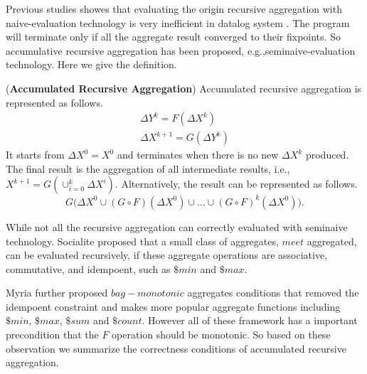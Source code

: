 {\color{red}
	Previous studies\cite{Seo:2013:DSD:2556549.2556572,Wang:2015:AFR:2824032.2824052,Lam:2013:SDE:2510649.2511289} showes that evaluating  the origin recursive aggregation with naive-evaluation technology is very inefficient in datalog system . The program will terminate only if all the aggregate result converged to their fixpoints. So accumulative recursive aggregation has been proposed, e.g.,seminaive-evaluation technology. Here we give the definition.
	
\begin{definition}
	\label{def:accumasync}
	(\textbf{Accumulated Recursive Aggregation}) Accumulated recursive aggregation is represented as follows.
	\begin{equation}\label{eq:accumasync}
	\begin{aligned}
	\Delta Y^{k}= F(\Delta X^k)\\
	\Delta X^{k+1}= G(\Delta Y^{k})
	\end{aligned}
	\end{equation}
	It starts from $\Delta X^0=X^0$ and terminates when there is no new $\Delta X^k$ produced. The final result is the aggregation of all intermediate results, i.e., $X^{k+1}=G(\cup_{i=0}^{k} \Delta X^{i})$. Alternatively, the result can be represented as follows.
	\begin{equation}
	\label{eq:accumasyncres}
	G\Big(\Delta X^0\cup (G\circ F)(\Delta X^0)\cup\ldots\cup (G\circ F)^k(\Delta X^0)\Big).
	\end{equation}
\end{definition}
	
	
While not all the recursive aggregation can correctly evaluated with seminaive technology.  %
Socialite\cite{} proposed that a small class of aggregates, $meet$ aggregated, can be evaluated recursively, if these aggregate operations are associative, commutative, and idempoent, such as $\$min$ and $\$max$.
	
Myria \cite{} further proposed $bag-monotonic$ aggregates conditions that removed the idempoent constraint and makes more popular aggregate functions including $\$min$, $\$max$, $\$sum$ and $\$count$.
However all of these framework has a important precondition that the $F$ operation should be monotonic. So based on these observation we summarize the correctness conditions of accumulated recursive aggregation.
}


